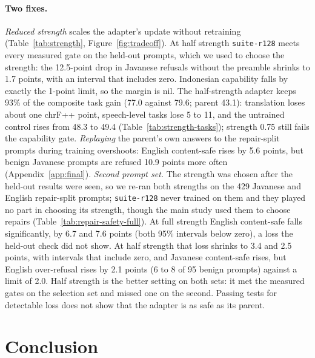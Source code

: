 \documentclass[11pt]{article}
\newcommand{\run}[1]{\texttt{#1}}
\begin{document}
\paragraph{Two fixes.} \textit{Reduced strength} scales the adapter's update without retraining
(Table~\ref{tab:strength}, Figure~\ref{fig:tradeoff}). At half strength \run{suite-r128} meets every measured gate on
the held-out prompts, which we used to choose the strength: the
12.5-point drop in Javanese refusals without the preamble shrinks to 1.7 points, with an interval that includes zero.
Indonesian capability falls by exactly the 1-point limit, so
the margin is nil. The half-strength adapter keeps 93\% of the composite task gain (77.0 against 79.6; parent 43.1):
translation loses about one chrF++ point, speech-level tasks lose 5 to 11, and the untrained control rises from 48.3
to 49.4 (Table~\ref{tab:strength-tasks}); strength 0.75 still fails the capability gate. \textit{Replaying} the parent's own answers to the repair-split
prompts during training overshoots: English content-safe rises by 5.6 points, but benign Javanese prompts are
refused 10.9 points more often (Appendix~\ref{app:final}). \textit{Second prompt set.} The strength was chosen after the held-out results were
seen, so we re-ran both strengths on the 429 Javanese and English repair-split prompts; \run{suite-r128} never trained
on them and they played no part in choosing its strength, though the main study used them to choose repairs
(Table~\ref{tab:repair-safety-full}). At full strength English content-safe falls significantly, by 6.7
and 7.6 points (both 95\% intervals below zero), a loss the held-out check did not show. At half
strength that loss shrinks to 3.4 and 2.5 points, with intervals that include zero, and Javanese content-safe rises,
but English over-refusal rises by 2.1 points (6 to 8 of 95 benign prompts) against a limit of 2.0. Half strength is
the better setting on both sets: it met the measured gates on the selection set and missed one on the second.
Passing tests for detectable loss does not show that the adapter is as safe as its parent.

\section{Conclusion}
\end{document}
